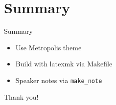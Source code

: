 \documentclass[10pt,aspectratio=169]{beamer}
\begin{document}
\section{Summary}
\begin{frame}{Summary}
  \begin{itemize}
    \item Use Metropolis theme
    \item Build with latexmk via Makefile
    \item Speaker notes via \texttt{make\_note}
  \end{itemize}
\end{frame}

\begin{frame}[standout]
  Thank you!
\end{frame}
\end{document}
